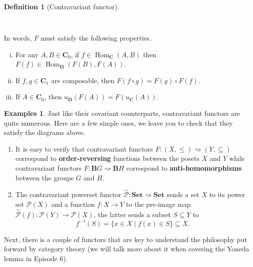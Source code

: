 \documentclass{article}
\theoremstyle{definition}
\newtheorem{defn}[thm]{Definition}
\newtheorem{exmps}[thm]{Examples}
\theoremstyle{remark}
\newcommand{\mP}{\mathcal{P}}
\DeclareMathOperator{\Hom}{Hom}
\begin{document}
\begin{defn}[Contravariant functor]
\begin{minipage}{0.31\textwidth}
\begin{equation}
\begin{tikzcd}
		\end{tikzcd}
		\end{equation}
	\end{minipage}\\
	In words, $F$ must satisfy the following properties.
	\begin{enumerate}[i.]
		\item For any $A, B \in \mathbf{C}_0$, if $f \in \Hom_{\mathbf{C}}(A,B)$ then $F(f) \in \Hom_{\mathbf{D}}(F(B), F(A))$.
		\item If $f,g \in \mathbf{C}_1$ are composable, then $F(f\circ g) = F(g) \circ F(f)$.
		\item If $A \in \mathbf{C}_0$, then $u_{\mathbf{D}}(F(A)) = F(u_{\mathbf{C}}(A))$.
	\end{enumerate}
\end{defn}
\begin{exmps}
	Just like their covariant counterparts, contravariant functors are quite numerous. Here are a few simple ones, we leave you to check that they satisfy the diagrams above.
	\begin{enumerate}
		\item It is easy to verify that contravariant functors $F: (X, \leq) \rightsquigarrow (Y, \subseteq)$ correspond to \textbf{order-reversing} functions between the posets $X$ and $Y$ while contravariant functors $F: \mathbf{B}G \rightsquigarrow \mathbf{B}H$ correspond to \textbf{anti-homomorphisms} between the groups $G$ and $H$.
		\item The contravariant powerset functor $\widehat{\mP}: \textbf{Set} \rightsquigarrow \textbf{Set}$ sends a set $X$ to its power set $\mP(X)$ and a function $f: X\rightarrow Y$ to the pre-image map $\widehat{\mP}(f):\mP(Y)\rightarrow \mP(X)$, the latter sends a subset $S\subseteq Y$ to \[f^{-1}(S) = \{x \in X \mid f(x) \in S\} \subseteq X.\]
	\end{enumerate}
\end{exmps}
Next, there is a couple of functors that are key to understand the philosophy put forward by category theory (we will talk more about it when covering the Yoneda lemma in Episode 6).
\end{document}
